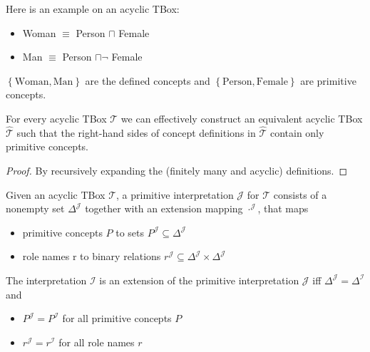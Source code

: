 \begin{example}
	Here is an example on an acyclic TBox:
	\begin{itemize}
		\item Woman $\equiv$ Person $\sqcap$ Female
		\item Man $\equiv$ Person $\sqcap \neg$ Female
	\end{itemize}
	$\left\{ \text{Woman}, \text{Man} \right\} $ are the defined concepts and $\left\{ \text{Person}, \text{Female} \right\}$ are primitive concepts.
\end{example}

\begin{prop}
	For every acyclic TBox $\mathcal{T}$ we can effectively construct an equivalent acyclic TBox $ \widehat{\mathcal{T}}$
	such that the right-hand sides of concept definitions in $\widehat{\mathcal{T}}$ contain only primitive concepts.
\end{prop}
\begin{proof}
	By recursively expanding the (finitely many and acyclic) definitions.
\end{proof}

Given an acyclic TBox $\mathcal{T}$, a primitive interpretation $\mathcal{J}$ for $\mathcal{T}$ 
consists of a nonempty set $\Delta^{\mathcal{J}}$ together with an extension mapping $\cdot^{\mathcal{J}}$, that maps
\begin{itemize}
	\item primitive concepts $P$ to sets $P^{\mathcal{J}} \subseteq \Delta^{\mathcal{J}}$ 
	\item role names r to binary relations $r^\mathcal{J} \subseteq \Delta^{\mathcal{J}} \times \Delta^{\mathcal{J}}$
\end{itemize}
The interpretation $\mathcal{I}$ is an extension of the primitive interpretation $\mathcal{J}$ iff $\Delta^{\mathcal{J}} = \Delta^{\mathcal{I}}$ and
 \begin{itemize}
	\item $P^{\mathcal{J}} = P^{\mathcal{I}}$ for all primitive concepts $P$ 
	\item $r^{\mathcal{J}} = r^{\mathcal{I}}$ for all role names $r$
\end{itemize}

